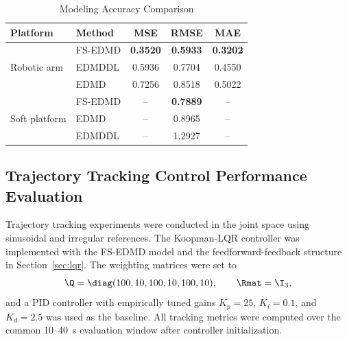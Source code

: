 \begin{table}[htbp]
\centering
\caption{Modeling Accuracy Comparison}
\label{tab:modeling_accuracy}
\small
\setlength{\tabcolsep}{3pt}
\begin{tabular}{llccc}
\toprule
Platform & Method & MSE & RMSE & MAE \\
\midrule
\multirow{3}{*}{Robotic arm}
    & FS-EDMD & \textbf{0.3520} & \textbf{0.5933} & \textbf{0.3202} \\
    & EDMDDL & 0.5936 & 0.7704 & 0.4550 \\
    & EDMD & 0.7256 & 0.8518 & 0.5022 \\
\midrule
\multirow{3}{*}{Soft platform}
    & FS-EDMD & -- & \textbf{0.7889} & -- \\
    & EDMD & -- & 0.8965 & -- \\
    & EDMDDL & -- & 1.2927 & -- \\
\bottomrule
\end{tabular}
\end{table}



\subsection{Trajectory Tracking Control Performance Evaluation}
\label{subsec:control_performance}

Trajectory tracking experiments were conducted in the joint space using sinusoidal and irregular references. The Koopman-LQR controller was implemented with the FS-EDMD model and the feedforward-feedback structure in Section~\ref{sec:lqr}. The weighting matrices were set to
\begin{equation*}
\Q=\diag(100,10,100,10,100,10), \qquad \Rmat=\I_3,
\end{equation*}
and a PID controller with empirically tuned gains $K_p=25$, $K_i=0.1$, and $K_d=2.5$ was used as the baseline. All tracking metrics were computed over the common 10--40~s evaluation window after controller initialization.


